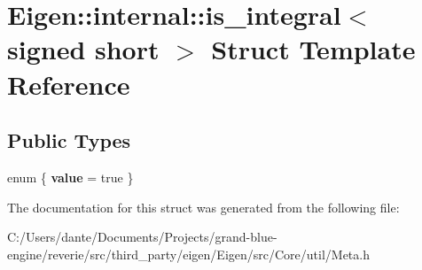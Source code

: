 \hypertarget{struct_eigen_1_1internal_1_1is__integral_3_01signed_01short_01_4}{}\section{Eigen\+::internal\+::is\+\_\+integral$<$ signed short $>$ Struct Template Reference}
\label{struct_eigen_1_1internal_1_1is__integral_3_01signed_01short_01_4}
\subsection*{Public Types}
\begin{DoxyCompactItemize}
\item 
\mbox{\label{struct_eigen_1_1internal_1_1is__integral_3_01signed_01short_01_4_a342ad675364e78e46b5ff1955072d058}} 
enum \{ {\bfseries value} = true
 \}
\end{DoxyCompactItemize}


The documentation for this struct was generated from the following file\+:\begin{DoxyCompactItemize}
\item 
C\+:/\+Users/dante/\+Documents/\+Projects/grand-\/blue-\/engine/reverie/src/third\+\_\+party/eigen/\+Eigen/src/\+Core/util/Meta.\+h\end{DoxyCompactItemize}

